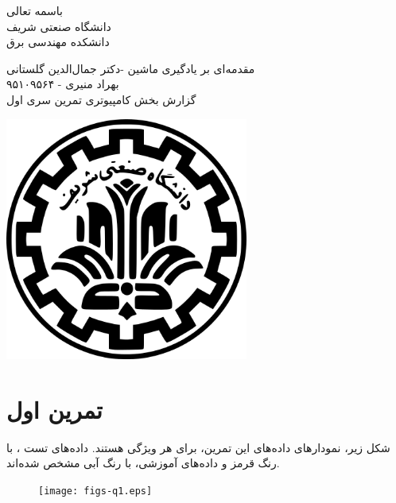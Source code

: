\documentclass[a4paper]{article}
\begin{document}
\begin{minipage}{0.6\textwidth}

\begin{center}
	\begin{bf}
	باسمه تعالی\\
	\vspace{0.25cm}
	دانشگاه صنعتی شریف\\
	\vspace{0.25cm}
	دانشکده مهندسی برق\\
	\vspace{0.5cm}

\large
مقدمه‌ای بر یادگیری ماشین -دکتر جمال‌الدین گلستانی\\
\vspace{0.3cm}
\normalsize
بهراد منیری - ۹۵۱۰۹۵۶۴\\
\Large
\vspace{0.3cm}
گزارش بخش کامپیوتری تمرین سری اول\\
\vspace{0.4cm}
\end{bf}
\end{center}
\normalsize
\end{minipage} \hfill
\begin{minipage}{0.35\textwidth}

\begin{flushleft}
\includegraphics[width=0.6\textwidth]{Shariflogo.png}\\ \large
\end{flushleft}

\end{minipage}
\section{تمرین اول}
شکل زیر، نمودار‌های 
داده‌های این تمرین، برای هر ویژگی هستند. داده‌های تست ، با رنگ قرمز و داده‌های آموزشی، با رنگ آبی مشخص شده‌اند.
\begin{figure}[h]
	\centering
	\texttt{[image: figs-q1.eps]}
\end{figure}
\end{document}

